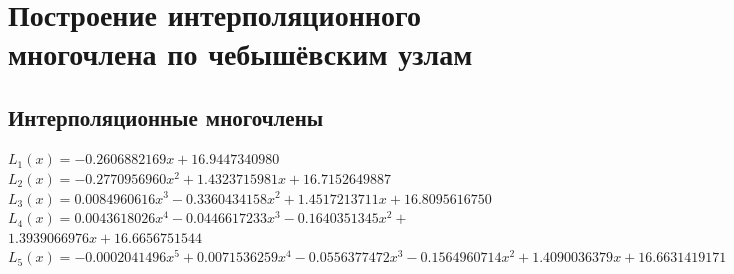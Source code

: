 \documentclass{article}
\begin{document}
\begin{figure}[h]
\begin{minipage}[h]{0.47\linewidth}
			  \\
		\end{minipage}
	\end{figure}
	
	\newpage
	
	\section{Построение интерполяционного многочлена по чебышёвским узлам}
		\subsection{Интерполяционные многочлены}
			\begin{flushleft}
				$ L_1(x)=-0.2606882169 x+16.9447340980 $\\
				$ L_2(x)=-0.2770956960 x^2+1.4323715981 x+16.7152649887 $\\
				$L_3(x)=0.0084960616x^3-0.3360434158x^2+1.4517213711x+ 16.8095616750$\\
				$L_4(x)= 0.0043618026x^4-0.0446617233x^3-0.1640351345x^2  +$\\
				$1.3939066976x+16.6656751544$\\
				$L_5(x)=-0.0002041496x^5+0.0071536259x^4-0.0556377472x^3 -0.1564960714x^2+1.4090036379x+16.6631419171$
			\end{flushleft}
		\newpage
\end{document}
